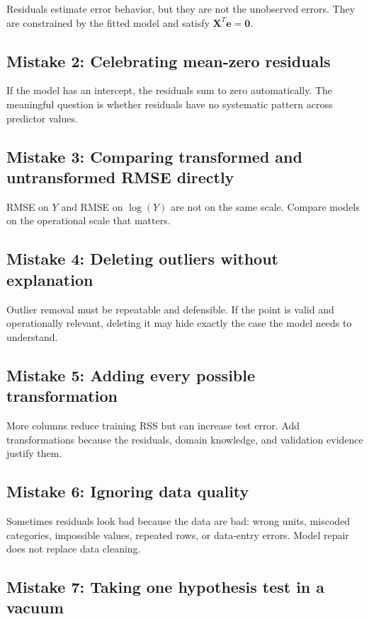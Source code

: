 {Residuals estimate error behavior, but they are not the unobserved errors.  They are constrained by the fitted model and satisfy \(\mathbf{X}^T\mathbf{e}=\mathbf{0}\).

\subsection*{Mistake 2: Celebrating mean-zero residuals}

If the model has an intercept, the residuals sum to zero automatically.  The meaningful question is whether residuals have no systematic pattern across predictor values.

\subsection*{Mistake 3: Comparing transformed and untransformed RMSE directly}

RMSE on \(Y\) and RMSE on \(\log(Y)\) are not on the same scale.  Compare models on the operational scale that matters.

\subsection*{Mistake 4: Deleting outliers without explanation}

Outlier removal must be repeatable and defensible.  If the point is valid and operationally relevant, deleting it may hide exactly the case the model needs to understand.

\subsection*{Mistake 5: Adding every possible transformation}

More columns reduce training RSS but can increase test error.  Add transformations because the residuals, domain knowledge, and validation evidence justify them.

\subsection*{Mistake 6: Ignoring data quality}

Sometimes residuals look bad because the data are bad: wrong units, miscoded categories, impossible values, repeated rows, or data-entry errors.  Model repair does not replace data cleaning.

\subsection*{Mistake 7: Taking one hypothesis test in a vacuum}

}
